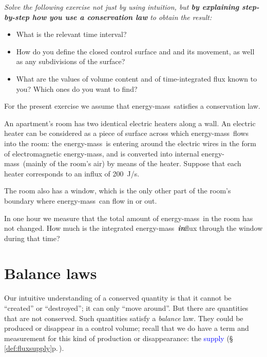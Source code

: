 \documentclass[a4paper,12pt,%
onecolumn,oneside,%
british%
]{memoir}
\renewcommand*{\|}[1][]{\nonscript\:#1\vert\nonscript\:\mathopen{}}
\newcommand*{\sect}{\S}%
\renewcommand*{\autoref}[3][\sect\,\ref]{\textcolor{blue}{#3} {\color{blue}\scriptsize(\faIcon[regular]{eye}\;#1{#2}\;p.\,\pageref{#2})}}
\newcommand*{\energym}{energy-mass}
\begin{document}
\begin{exercise}
{\itshape Solve the following exercise not just by using intuition, but \textbf{by explaining step-by-step how you use a conservation law} to obtain the result:
\begin{itemize}[nosep]
\item What is the relevant time interval?
\item How do you define the closed control surface and and its movement, as well as any subdivisions of the surface?
\item What are the values of volume content and of time-integrated flux  known to you? Which ones do you want to find?
\end{itemize}}

\medskip

For the present exercise we assume that \energym\ satisfies a conservation law.

    \smallskip

An apartment's room has two identical electric heaters along a wall. An electric heater can be considered as a piece of surface across which \energym\ flows into the room: the \energym\ is entering around the electric wires in the form of electromagnetic \energym, and is converted into internal \energym\ (mainly of the room's air) by means of the heater. Suppose that each heater corresponds to an influx of \qty{200}{J/s}.

\smallskip

    The room also has a window, which is the only other part of the room's boundary where \energym\ can flow in or out.

    \smallskip

    In one hour we measure that the total amount of \energym\ in the room has not changed. How much is the integrated \energym\ \emph{\textbf{in}}flux through the window during that time?
\end{exercise}




\section{Balance laws}
\label{sec:balance_laws}

Our intuitive understanding of a conserved quantity is that it cannot be \enquote{created} or \enquote{destroyed}; it can only \enquote{move around}. But there are quantities that are not conserved. Such quantities satisfy a \emph{balance} law. They could be produced or disappear in a control volume; recall that we do have a term and measurement for this kind of production or disappearance: the \autoref{def:fluxsupply}{supply}.
\end{document}
